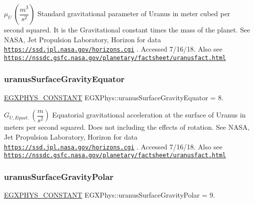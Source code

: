 $ \mu_{U} \ (\dfrac{m^3}{s^2})$ Standard gravitational parameter of Uranus in meter cubed per second squared. It is the Gravitational constant times the mass of the planet. See N\+A\+SA, Jet Propulsion Laboratory, Horizon for data \href{https://ssd.jpl.nasa.gov/horizons.cgi}{\tt https\+://ssd.\+jpl.\+nasa.\+gov/horizons.\+cgi} . Accessed 7/16/18. Also see \href{https://nssdc.gsfc.nasa.gov/planetary/factsheet/uranusfact.html}{\tt https\+://nssdc.\+gsfc.\+nasa.\+gov/planetary/factsheet/uranusfact.\+html} \mbox{\label{group___e_g_x_phys-_constants-_astrophysics-_solar_system-_uranus-_bulk_gaf69b423e76cf2feda0f1ea87eedc698b}} 
\subsubsection{\texorpdfstring{uranus\+Surface\+Gravity\+Equator}{uranusSurfaceGravityEquator}}
{\footnotesize\ttfamily \mbox{\hyperlink{group___e_g_x_phys-_constants-_macros_ga76980d288494ce1714c9ac68a95ba702}{E\+G\+X\+P\+H\+Y\+S\+\_\+\+C\+O\+N\+S\+T\+A\+NT}} E\+G\+X\+Phys\+::uranus\+Surface\+Gravity\+Equator = 8.}

$ G_{U,Equat.} \ (\dfrac{m}{s^2})$ Equatorial gravitational acceleration at the surface of Uranus in meters per second squared. Does not including the effects of rotation. See N\+A\+SA, Jet Propulsion Laboratory, Horizon for data \href{https://ssd.jpl.nasa.gov/horizons.cgi}{\tt https\+://ssd.\+jpl.\+nasa.\+gov/horizons.\+cgi} . Accessed 7/16/18. Also see \href{https://nssdc.gsfc.nasa.gov/planetary/factsheet/uranusfact.html}{\tt https\+://nssdc.\+gsfc.\+nasa.\+gov/planetary/factsheet/uranusfact.\+html} \mbox{\label{group___e_g_x_phys-_constants-_astrophysics-_solar_system-_uranus-_bulk_gaac7f0c911f8e118ff773010111851360}} 
\subsubsection{\texorpdfstring{uranus\+Surface\+Gravity\+Polar}{uranusSurfaceGravityPolar}}
{\footnotesize\ttfamily \mbox{\hyperlink{group___e_g_x_phys-_constants-_macros_ga76980d288494ce1714c9ac68a95ba702}{E\+G\+X\+P\+H\+Y\+S\+\_\+\+C\+O\+N\+S\+T\+A\+NT}} E\+G\+X\+Phys\+::uranus\+Surface\+Gravity\+Polar = 9.}

